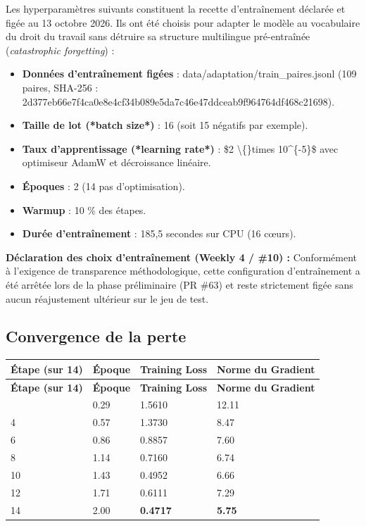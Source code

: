 \documentclass[11pt,a4paper]{article}
\newcommand{\code}[1]  {{\ttfamily #1}}
\newcommand{\thead}[1]{{\tabfont\bfseries\color{accent}\hspace{0pt}#1}}
\newenvironment{tabletype}
  {\par\addvspace{7pt}\begingroup
   \tabfont\setlength{\tabcolsep}{4pt}\renewcommand{\arraystretch}{1.26}
   \setlength{\LTleft}{0pt}\setlength{\LTright}{0pt}
   \setlength{\extrarowheight}{1pt}
   \hyphenpenalty=9000\exhyphenpenalty=9000
   \emergencystretch=0pt\hbadness=10000\relax}
  {\endgroup\par\addvspace{9pt}}
\newlength{\tw}\setlength{\tw}{\textwidth}
\newcommand{\settw}[1]{\setlength{\tw}{\dimexpr\textwidth-#1pt\relax}}
\begin{document}
Les hyperparamètres suivants constituent la recette d'entraînement déclarée et figée au 13 octobre 2026. Ils ont été choisis pour adapter le modèle au vocabulaire du droit du travail sans détruire sa structure multilingue pré-entraînée (\textit{catastrophic forgetting}) :
\begin{itemize}
\item \textbf{Données d'entraînement figées} : \code{data/\allowbreak{}adaptation/\allowbreak{}train\_\allowbreak{}paires.\allowbreak{}jsonl} (109 paires, SHA-256 : \code{2d377eb66e7f4ca0e8e4cf34b089e5da7c46e47ddceab9f964764df468c21698}).
\item \textbf{Taille de lot (*batch size*)} : 16 (soit 15 négatifs par exemple).
\item \textbf{Taux d'apprentissage (*learning rate*)} : \$2 \textbackslash\{\}times 10\textasciicircum{}\{-5\}\$ avec optimiseur AdamW et décroissance linéaire.
\item \textbf{Époques} : 2 (14 pas d'optimisation).
\item \textbf{Warmup} : 10 \% des étapes.
\item \textbf{Durée d'entraînement} : 185,5 secondes sur CPU (16 cœurs).
\end{itemize}
\begin{callout}
\textbf{Déclaration des choix d'entraînement (Weekly 4 / \#10) :}   Conformément à l'exigence de transparence méthodologique, cette configuration d'entraînement a été arrêtée lors de la phase préliminaire (PR \#63) et reste strictement figée sans aucun réajustement ultérieur sur le jeu de test.
\end{callout}

\subsection{Convergence de la perte}
\begin{tabletype}
\small
\settw{24.0}
\setlength{\LTpre}{0pt}\setlength{\LTpost}{0pt}
\begin{longtable}{@{}L{0.25296\tw}L{0.13966\tw}L{0.27800\tw}L{0.32938\tw}@{}}
\toprule
\thead{Étape (sur 14)} & \thead{Époque} & \thead{Training Loss} & \thead{Norme du Gradient} \\
\midrule
\endfirsthead
\toprule
\thead{Étape (sur 14)} & \thead{Époque} & \thead{Training Loss} & \thead{Norme du Gradient} \\
\midrule
\endhead
\bottomrule
\endfoot
\bottomrule
{} & 0.29 & 1.5610 & 12.11 \\
4 & 0.57 & 1.3730 & 8.47 \\
6 & 0.86 & 0.8857 & 7.60 \\
8 & 1.14 & 0.7160 & 6.74 \\
10 & 1.43 & 0.4952 & 6.66 \\
12 & 1.71 & 0.6111 & 7.29 \\
14 & 2.00 & \textbf{0.4717} & \textbf{5.75} \\
\end{longtable}
\end{tabletype}
\end{document}
